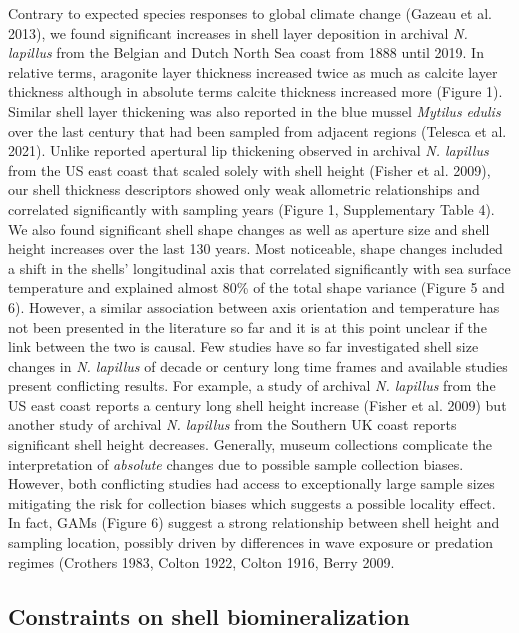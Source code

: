 \documentclass[smallextended]{svjour3}       %
\begin{document}
Contrary to expected species responses to global climate change (Gazeau
et al. 2013), we found significant increases in shell layer deposition
in archival \emph{N. lapillus} from the Belgian and Dutch North Sea
coast from 1888 until 2019. In relative terms, aragonite layer thickness
increased twice as much as calcite layer thickness although in absolute
terms calcite thickness increased more (Figure 1). Similar shell layer
thickening was also reported in the blue mussel \emph{Mytilus edulis}
over the last century that had been sampled from adjacent regions
(Telesca et al. 2021). Unlike reported apertural lip thickening observed
in archival \emph{N. lapillus} from the US east coast that scaled solely
with shell height (Fisher et al. 2009), our shell thickness descriptors
showed only weak allometric relationships and correlated significantly
with sampling years (Figure 1, Supplementary Table 4). We also found
significant shell shape changes as well as aperture size and shell
height increases over the last 130 years. Most noticeable, shape changes
included a shift in the shells' longitudinal axis that correlated
significantly with sea surface temperature and explained almost 80\% of
the total shape variance (Figure 5 and 6). However, a similar
association between axis orientation and temperature has not been
presented in the literature so far and it is at this point unclear if
the link between the two is causal. Few studies have so far investigated
shell size changes in \emph{N. lapillus} of decade or century long time
frames and available studies present conflicting results. For example, a
study of archival \emph{N. lapillus} from the US east coast reports a
century long shell height increase (Fisher et al. 2009) but another
study of archival \emph{N. lapillus} from the Southern UK coast reports
significant shell height decreases. Generally, museum collections
complicate the interpretation of \emph{absolute} changes due to possible
sample collection biases. However, both conflicting studies had access
to exceptionally large sample sizes mitigating the risk for collection
biases which suggests a possible locality effect. In fact, GAMs (Figure
6) suggest a strong relationship between shell height and sampling
location, possibly driven by differences in wave exposure or predation
regimes (Crothers 1983, Colton 1922, Colton 1916, Berry 2009.

\hypertarget{constraints-on-shell-biomineralization}{%
\subsection{Constraints on shell
biomineralization}\label{constraints-on-shell-biomineralization}}
\end{document}
